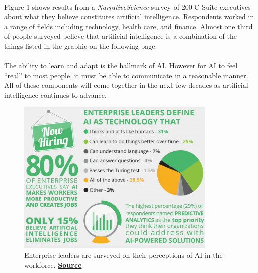 \documentclass{article}
\begin{document}
    \paragraph{}
      Figure 1 shows results from a \textit{NarrativeScience} survey of 200 C-Suite
      executives about what they believe constitutes artificial intelligence.
      Respondents worked in a range of fields including technology, health care,
      and finance. Almost one third of people surveyed believe that
      artificial intelligence is a combination of the things listed in the graphic
      on the following page. %

    \paragraph{}
      The ability to learn and adapt is the hallmark of AI. However for AI to feel
      ``real'' to most people, it must be able to communicate in a
      reasonable manner. All of these components will come
      together in the next few decades as artificial intelligence continues to
      advance.

    \begin{figure}[ht]
      \centering
      \captionsetup{width=.85\linewidth}
      \includegraphics[width=0.85\textwidth,height=\textheight, keepaspectratio]{Figure1}
      \caption{Enterprise leaders are surveyed on their perceptions of AI in the workforce.
               \href{http://thumbnails-visually.netdna-ssl.com/artificial-intelligence-is-not-killing-jobs_557b4376e27b8_w1500.jpg}
               {\textbf{Source}}}
    \end{figure}

  \cleardoublepage
\end{document}

